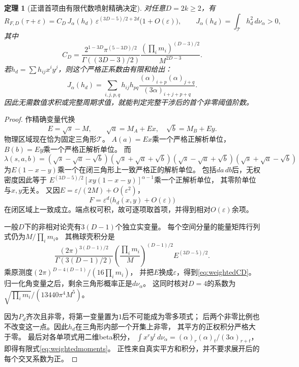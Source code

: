 \documentclass[11pt,a4paper]{ctexart}
\theoremstyle{cnplain}\newtheorem{theorem}{定理}[section]
\theoremstyle{definition}\newtheorem{definition}[theorem]{定义}
\theoremstyle{remark}\newtheorem{remark}[theorem]{注}
\begin{document}
\begin{theorem}[正谱首项由有限代数喷射精确决定]\label{thm:weightedjet}
对任意$D=2k\ge2$，有
\begin{equation}\label{eq:weightedthreshold}
 R_{F,D}(\tau+\varepsilon)
 =C_D\,J_\alpha(h_d)\,
 \varepsilon^{(3D-5)/2+2d}\bigl(1+O(\varepsilon)\bigr),
 \qquad J_\alpha(h_d)=\int_{\mathcal T}h_d^2\,d\nu_\alpha>0,
\end{equation}
其中
\begin{equation}\label{eq:weightedCD}
 C_D=
 \frac{2^{1-3D}\pi^{(5-3D)/2}}{\Gamma((3D-3)/2)}
 \frac{(\prod_i m_i)^{(D-3)/2}}{M^{2D-3}}.
\end{equation}
若$h_d=\sum h_{ij}x^iy^j$，则这个严格正系数由有限和给出：
\begin{equation}\label{eq:weightedmoments}
 J_\alpha(h_d)=
 \sum_{i,j,p,q}h_{ij}h_{pq}
 \frac{(\alpha)_{i+p}(\alpha)_{j+q}}{(3\alpha)_{i+j+p+q}}.
\end{equation}
因此无需数值求积或完整周期求值，就能判定完整干涉后的首个非零阈值阶数。
\end{theorem}
\begin{proof}
作精确变量代换
\[
 E=\sqrt{s}-M,\qquad
 \sqrt a=M_A+Ex,\quad \sqrt b=M_B+Ey.
\]
物理区域现在恰为固定三角形$\mathcal T$。
$A(a)=Ex$乘一个严格正解析单位，$B(b)=Ey$乘一个严格正解析单位。
而
\[
 \lambda(s,a,b)=(\sqrt s-\sqrt a-\sqrt b)(\sqrt s+\sqrt a+\sqrt b)
                (\sqrt s-\sqrt a+\sqrt b)(\sqrt s+\sqrt a-\sqrt b)
\]
为$E(1-x-y)$乘一个在闭三角形上一致严格正的解析单位。
包括$da\,db$后，无权密度因此等于
$E^{(3D-5)/2}[xy(1-x-y)]^{\alpha-1}$乘一个正解析单位，
其零阶单位与$x,y$无关。
又因$E=\varepsilon/(2M)+O(\varepsilon^2)$，
\[
 F=\varepsilon^d\bigl(h_d(x,y)+O(\varepsilon)\bigr)
\]
在闭区域上一致成立。端点权可积，故可逐项取首项，并得到相对$O(\varepsilon)$余项。

一般$D$下的非相对论壳有$3(D-1)$个独立实变量。
每个空间分量的能量矩阵行列式仍为$M/\prod_i m_i$。
其椭球壳积分是
\[
 \frac{(2\pi)^{3(D-1)/2}}{\Gamma(3(D-1)/2)}
 \left(\frac{\prod_i m_i}{M}\right)^{(D-1)/2}
 E^{(3D-5)/2}.
\]
乘原测度$(2\pi)^{D-4(D-1)}/(16\prod_i m_i)$，
并把$E$换成$\varepsilon$，得到\eqref{eq:weightedCD}。
归一化角变量之后，剩余三角形概率正是$d\nu_\alpha$。
这同时核对$D=4$的系数为$\sqrt{\prod_i m_i}/(13440\pi^4M^5)$。

因为$P_d$齐次且非零，将第一变量置为$1$后不可能成为零多项式；
后两个非零比例也不改变这一点。因此$h_d$在三角形内部一个开集上非零，
其平方的正权积分严格大于零。
最后对各单项式用二维beta积分，
$\int x^ry^t\,d\nu_\alpha=(\alpha)_r(\alpha)_t/(3\alpha)_{r+t}$，
即得有限式\eqref{eq:weightedmoments}。
正性来自真实平方和积分，并不要求展开后的每个交叉系数为正。
\end{proof}
\end{document}
